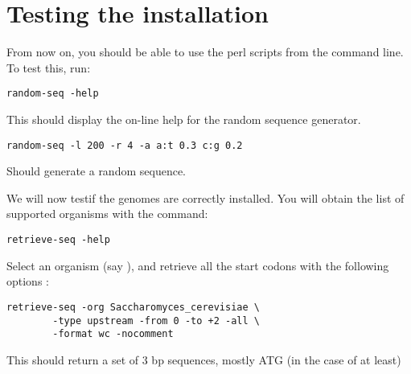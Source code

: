 \documentclass{article}
\begin{document}
\section{Testing the installation}

From now on, you should be able to use the perl scripts from the
command line. To test this, run: 

\begin{verbatim}
random-seq -help
\end{verbatim}

This should display the on-line help for the random sequence
generator. 

\begin{verbatim}
random-seq -l 200 -r 4 -a a:t 0.3 c:g 0.2
\end{verbatim}

Should generate a random sequence.

We will now testif the genomes are correctly installed. You will
obtain the list of supported organisms with the command:

\begin{verbatim}
retrieve-seq -help
\end{verbatim}

Select an organism (say ), and
retrieve all the start codons with the following options :

\begin{verbatim}
retrieve-seq -org Saccharomyces_cerevisiae \
        -type upstream -from 0 -to +2 -all \
        -format wc -nocomment 
\end{verbatim}

This should return a set of 3 bp sequences, mostly ATG (in the case of
 at least)
\end{document}
